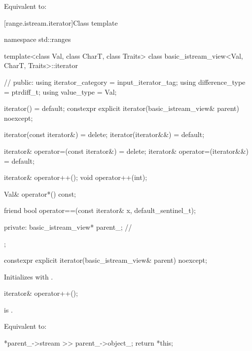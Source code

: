 \begin{itemdescr}
\pnum
\effects
Equivalent to: 
\end{itemdescr}

[range.istream.iterator]{Class template }

\begin{codeblock}
namespace std::ranges {
  template<class Val, class CharT, class Traits>
  class basic_istream_view<Val, CharT, Traits>::iterator {      // \expos
  public:
    using iterator_category = input_iterator_tag;
    using difference_type = ptrdiff_t;
    using value_type = Val;

    iterator() = default;
    constexpr explicit iterator(basic_istream_view& parent) noexcept;

    iterator(const iterator&) = delete;
    iterator(iterator&&) = default;

    iterator& operator=(const iterator&) = delete;
    iterator& operator=(iterator&&) = default;

    iterator& operator++();
    void operator++(int);

    Val& operator*() const;

    friend bool operator==(const iterator& x, default_sentinel_t);

  private:
    basic_istream_view* parent_{};                              // \expos
  };
}
\end{codeblock}

\begin{itemdecl}
constexpr explicit iterator(basic_istream_view& parent) noexcept;
\end{itemdecl}

\begin{itemdescr}
\pnum
\effects
Initializes  with .
\end{itemdescr}

\begin{itemdecl}
iterator& operator++();
\end{itemdecl}

\begin{itemdescr}
\pnum
\expects
{} is .

\pnum
\effects
Equivalent to:
\begin{codeblock}
*parent_->stream >> parent_->object_;
return *this;
\end{codeblock}
\end{itemdescr}

